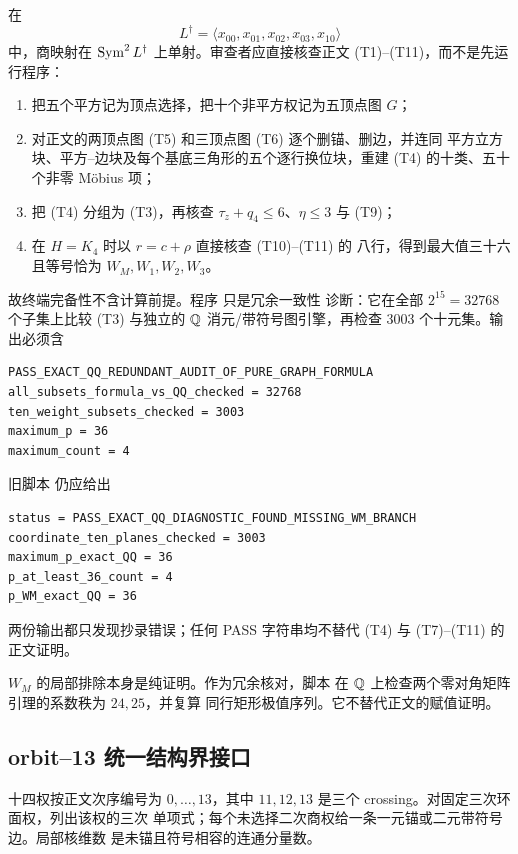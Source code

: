 在
\[
L^\dagger=\langle x_{00},x_{01},x_{02},x_{03},x_{10}\rangle
\]
中，商映射在 \(\operatorname{Sym}^2L^\dagger\) 上单射。审查者应直接核查正文
(T1)--(T11)，而不是先运行程序：
\begin{enumerate}
\item 把五个平方记为顶点选择，把十个非平方权记为五顶点图 \(G\)；
\item 对正文的两顶点图 (T5) 和三顶点图 (T6) 逐个删锚、删边，并连同
平方立方块、平方--边块及每个基底三角形的五个逐行换位块，重建
(T4) 的十类、五十个非零 Möbius 项；
\item 把 (T4) 分组为 (T3)，再核查
\(\tau_z+q_4\le6\)、\(\eta\le3\) 与 (T9)；
\item 在 \(H=K_4\) 时以 \(r=c+\rho\) 直接核查 (T10)--(T11) 的
八行，得到最大值三十六且等号恰为 \(W_M,W_1,W_2,W_3\)。
\end{enumerate}

故终端完备性不含计算前提。程序
 只是冗余一致性
诊断：它在全部 \(2^{15}=32768\) 个子集上比较 (T3) 与独立的
\(\mathbb Q\) 消元/带符号图引擎，再检查 3003 个十元集。输出必须含
\begin{verbatim}
PASS_EXACT_QQ_REDUNDANT_AUDIT_OF_PURE_GRAPH_FORMULA
all_subsets_formula_vs_QQ_checked = 32768
ten_weight_subsets_checked = 3003
maximum_p = 36
maximum_count = 4
\end{verbatim}
旧脚本  仍应给出
\begin{verbatim}
status = PASS_EXACT_QQ_DIAGNOSTIC_FOUND_MISSING_WM_BRANCH
coordinate_ten_planes_checked = 3003
maximum_p_exact_QQ = 36
p_at_least_36_count = 4
p_WM_exact_QQ = 36
\end{verbatim}
两份输出都只发现抄录错误；任何 PASS 字符串均不替代 (T4) 与
(T7)--(T11) 的正文证明。

\(W_M\) 的局部排除本身是纯证明。作为冗余核对，脚本
在 \(\mathbb Q\) 上检查两个零对角矩阵引理的系数秩为 \(24,25\)，并复算
同行矩形极值序列。它不替代正文的赋值证明。

\subsection{orbit--13 统一结构界接口}

十四权按正文次序编号为 \(0,\ldots,13\)，其中
\(11,12,13\) 是三个 crossing。对固定三次环面权，列出该权的三次
单项式；每个未选择二次商权给一条一元锚或二元带符号边。局部核维数
是未锚且符号相容的连通分量数。

